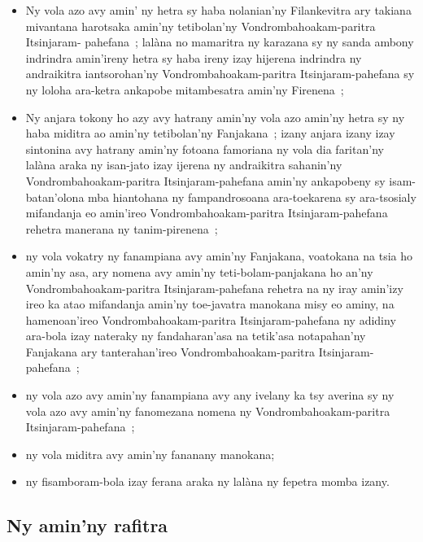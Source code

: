\documentclass[12pt]{article}
\begin{document}
\begin{itemize}
\item Ny vola azo avy amin' ny hetra sy haba nolanian'ny Filankevitra ary
  takiana mivantana harotsaka amin'ny tetibolan'ny Vondrombahoakam-paritra
  Itsinjaram- pahefana~; lalàna no mamaritra ny karazana sy ny sanda ambony
  indrindra amin'ireny hetra sy haba ireny izay hijerena indrindra ny
  andraikitra iantsorohan'ny Vondrombahoakam-paritra Itsinjaram-pahefana sy ny
  loloha ara-ketra ankapobe mitambesatra amin'ny Firenena~;

\item Ny anjara tokony ho azy avy hatrany amin'ny vola azo amin'ny hetra sy ny
  haba miditra ao amin'ny tetibolan'ny Fanjakana~; izany anjara izany izay
  sintonina avy hatrany amin'ny fotoana famoriana ny vola dia faritan'ny lalàna
  araka ny isan-jato izay ijerena ny andraikitra sahanin'ny
  Vondrombahoakam-paritra Itsinjaram-pahefana amin'ny ankapobeny sy
  isam-batan'olona mba hiantohana ny fampandrosoana ara-toekarena sy
  ara-tsosialy mifandanja eo amin'ireo Vondrombahoakam-paritra
  Itsinjaram-pahefana rehetra manerana ny tanim-pirenena~;

\item ny vola vokatry ny fanampiana avy amin'ny Fanjakana, voatokana na tsia ho
  amin'ny asa, ary nomena avy amin'ny teti-bolam-panjakana ho an'ny
  Vondrombahoakam-paritra Itsinjaram-pahefana rehetra na ny iray amin'izy ireo
  ka atao mifandanja amin'ny toe-javatra manokana misy eo aminy, na
  hamenoan'ireo Vondrombahoakam-paritra Itsinjaram-pahefana ny adidiny ara-bola
  izay nateraky ny fandaharan'asa na tetik'asa notapahan'ny Fanjakana ary
  tanterahan'ireo Vondrombahoakam-paritra Itsinjaram-pahefana~;

\item ny vola azo avy amin'ny fanampiana avy any ivelany ka tsy averina sy ny
  vola azo avy amin'ny fanomezana nomena ny Vondrombahoakam-paritra
  Itsinjaram-pahefana~;

\item ny vola miditra avy amin'ny fananany manokana;

\item ny fisamboram-bola izay ferana araka ny lalàna ny fepetra momba izany.
\end{itemize}

\subsection{Ny amin'ny rafitra}
\label{sec:ny-aminny-rafitra}
\end{document}
